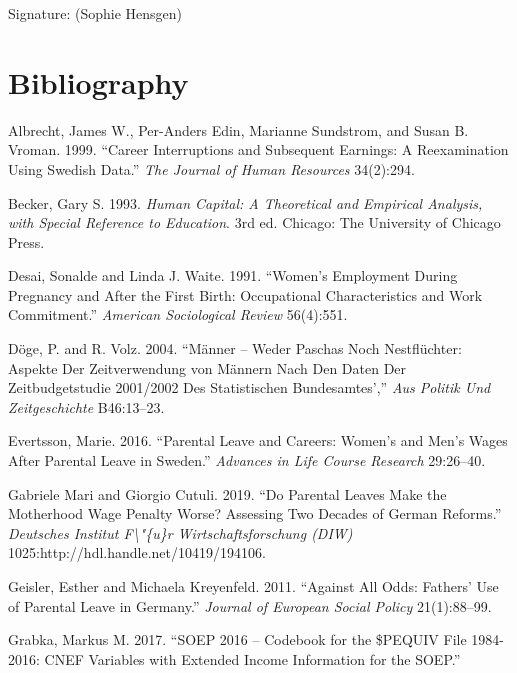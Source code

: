 \documentclass[
  12pt,
]{article}
\begin{document}
Signature:
(Sophie Hensgen)

\newpage

\hypertarget{bibliography}{%
\section*{Bibliography}\label{bibliography}}

\hypertarget{refs}{}
\leavevmode\hypertarget{ref-albrecht_career_1999}{}%
Albrecht, James W., Per-Anders Edin, Marianne Sundstrom, and Susan B. Vroman. 1999. ``Career Interruptions and Subsequent Earnings: A Reexamination Using Swedish Data.'' \emph{The Journal of Human Resources} 34(2):294.

\leavevmode\hypertarget{ref-becker_human_1993}{}%
Becker, Gary S. 1993. \emph{Human Capital: A Theoretical and Empirical Analysis, with Special Reference to Education}. 3rd ed. Chicago: The University of Chicago Press.

\leavevmode\hypertarget{ref-desai_womens_1991}{}%
Desai, Sonalde and Linda J. Waite. 1991. ``Women's Employment During Pregnancy and After the First Birth: Occupational Characteristics and Work Commitment.'' \emph{American Sociological Review} 56(4):551.

\leavevmode\hypertarget{ref-doge_manner_2004}{}%
Döge, P. and R. Volz. 2004. ``Männer -- Weder Paschas Noch Nestflüchter: Aspekte Der Zeitverwendung von Männern Nach Den Daten Der Zeitbudgetstudie 2001/2002 Des Statistischen Bundesamtes','' \emph{Aus Politik Und Zeitgeschichte} B46:13--23.

\leavevmode\hypertarget{ref-evertsson_parental_2016}{}%
Evertsson, Marie. 2016. ``Parental Leave and Careers: Women's and Men's Wages After Parental Leave in Sweden.'' \emph{Advances in Life Course Research} 29:26--40.

\leavevmode\hypertarget{ref-gabriele_mari_parental_2019}{}%
Gabriele Mari and Giorgio Cutuli. 2019. ``Do Parental Leaves Make the Motherhood Wage Penalty Worse? Assessing Two Decades of German Reforms.'' \emph{Deutsches Institut F\textbackslash"\{u\}r Wirtschaftsforschung (DIW)} 1025:http://hdl.handle.net/10419/194106.

\leavevmode\hypertarget{ref-geisler_against_2011}{}%
Geisler, Esther and Michaela Kreyenfeld. 2011. ``Against All Odds: Fathers' Use of Parental Leave in Germany.'' \emph{Journal of European Social Policy} 21(1):88--99.

\leavevmode\hypertarget{ref-grabka_soep_2017}{}%
Grabka, Markus M. 2017. ``SOEP 2016 -- Codebook for the \$PEQUIV File 1984-2016: CNEF Variables with Extended Income Information for the SOEP.''
\end{document}
